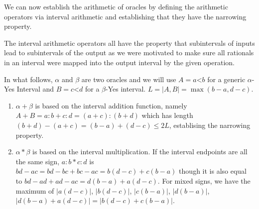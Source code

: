 \documentclass[12pt]{article}
\theoremstyle{remark}
\newcommand{\lt}{\mathord{<}}
\begin{document}
We can now establish the arithmetic of oracles by defining the arithmetic operators via interval arithmetic and establishing that they have the narrowing property.

The interval arithmetic operators all have the property that subintervals of inputs lead to subintervals of the output as we were motivated to make sure all rationals in an interval were mapped into the output interval by the given operation. 

In what follows, $\alpha$ and $\beta$ are two oracles and we will use $A=a\lt b$ for a generic $\alpha$-Yes Interval and $B=c\lt d$ for  a $\beta$-Yes interval.  $L = |A,B| = \max(b-a, d-c)$. 


\begin{enumerate}
    \item $\alpha+\beta$ is based on the interval addition function, namely $A + B = a:b + c:d = (a+c):(b+d)$ which has length $(b+d) - (a+c) = (b-a) + (d-c) \leq 2L$, establising the narrowing property. 
    \item $\alpha *\beta$ is based on the interval multiplication. If the interval endpoints are all the same sign, $a:b*c:d$ is $bd-ac = bd -bc + bc -ac =  b(d-c) + c(b-a)$ though it is also equal to $bd - ad + ad - ac = d(b-a) + a(d-c)$. For mixed signs, we have the maximum of $|a(d-c)|$, $|b(d-c)|$, $|c(b-a)|$, $|d(b-a)|$, $|d(b-a)+a(d-c)| = |b(d-c) + c(b-a)|$. 
    

\end{enumerate}
\end{document}
